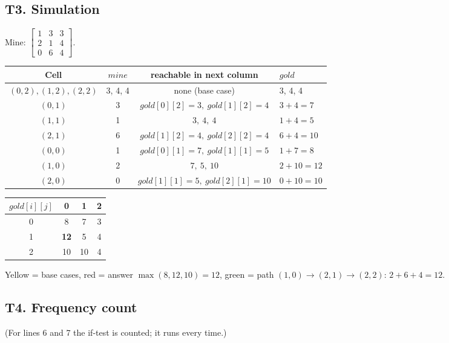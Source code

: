\documentclass[11pt]{article}
\begin{document}
\subsection*{T3. Simulation}

Mine: $\begin{bmatrix} 1 & 3 & 3\\ 2 & 1 & 4\\ 0 & 6 & 4\end{bmatrix}$.

\begin{center}
\begin{tabular}{cccl}
\toprule
Cell & $mine$ & reachable in next column & $gold$ \\
\midrule
$(0,2),(1,2),(2,2)$ & 3, 4, 4 & none (base case) & 3, 4, 4 \\
$(0,1)$ & 3 & $gold[0][2]=3,\ gold[1][2]=4$ & $3+4=7$ \\
$(1,1)$ & 1 & $3,\ 4,\ 4$ & $1+4=5$ \\
$(2,1)$ & 6 & $gold[1][2]=4,\ gold[2][2]=4$ & $6+4=10$ \\
$(0,0)$ & 1 & $gold[0][1]=7,\ gold[1][1]=5$ & $1+7=8$ \\
$(1,0)$ & 2 & $7,\ 5,\ 10$ & $2+10=12$ \\
$(2,0)$ & 0 & $gold[1][1]=5,\ gold[2][1]=10$ & $0+10=10$ \\
\bottomrule
\end{tabular}
\end{center}

\begin{center}
\begin{tabular}{c|ccc}
$gold[i][j]$ & 0 & 1 & 2 \\ \hline
0 & 8 & 7 & \cellcolor{base}3 \\
1 & \cellcolor{ans}\textbf{12} & 5 & \cellcolor{base}4 \\
2 & 10 & \cellcolor{path}10 & \cellcolor{path}4 \\
\end{tabular}
\end{center}

Yellow = base cases, red = answer $\max(8, 12, 10) = 12$, green = path $(1,0) \to (2,1) \to (2,2)$: $2 + 6 + 4 = 12$.

\subsection*{T4. Frequency count}

(For lines 6 and 7 the if-test is counted; it runs every time.)
\end{document}

